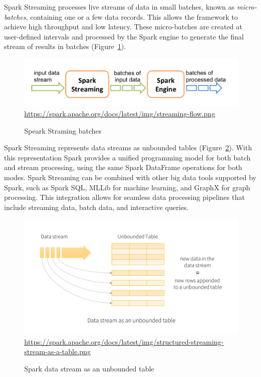 Spark Streaming processes live streams of data in small batches, known as \emph{micro-batches}, containing one or a few data records. This allows the framework to achieve high throughput and low latency. These micro-batches are created at user-defined intervals and processed by the Spark engine to generate the final stream of results in batches (Figure~\ref{fig:sparkstreaming2}).

\begin{figure}
\centering

\includegraphics[width=.75\textwidth]{streaming-flow.png}  \\

\scriptsize\url{https://spark.apache.org/docs/latest/img/streaming-flow.png}
\caption{Speark Straming batches}
\label{fig:sparkstreaming2}
\end{figure}

Spark Streaming represents data streams as unbounded tables (Figure~\ref{fig:sparkstreamtable}). With this representation Spark provides a unified programming model for both batch and stream processing, using the same Spark DataFrame operations for both modes. Spark Streaming can be combined with other big data tools supported by Spark, such as Spark SQL, MLLib for machine learning, and GraphX for graph processing. This integration allows for seamless data processing pipelines that include streaming data, batch data, and interactive queries.

\begin{figure}
\centering

\includegraphics[width=\textwidth]{stream-as-a-table.png} \\

\scriptsize\url{https://spark.apache.org/docs/latest/img/structured-streaming-stream-as-a-table.png}
\caption{Spark data stream as an unbounded table}
\label{fig:sparkstreamtable}
\end{figure}

